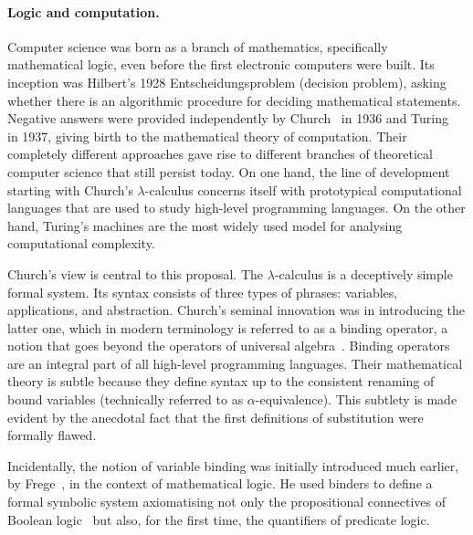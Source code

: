 \documentclass[11pt,twocolumn]{article}
\newcommand{\pref}[1]{\,(\ref{#1})}
\newcommand{\lcalculus}{\mbox{$\lambda$-calculus}}
\begin{document}
\paragraph{Logic and computation.}

Computer science was born as a branch of mathematics, specifically
mathematical logic, even before the first electronic computers were built.
Its inception %
was Hilbert's %
1928 Entscheidungsproblem (decision problem),
asking whether there is an algorithmic procedure for deciding mathematical
statements.  Negative answers were provided independently by
Church~\cite{Church1936} in 1936 and Turing~\cite{Turing} in 1937,
giving birth to the mathematical theory of computation.  Their completely
different approaches gave rise to different branches of theoretical
computer science that still persist today.  
On one hand, the line
of development starting with Church's {\lcalculus} %
concerns itself with prototypical computational languages that are
used to study high-level programming languages.  
On the other hand, Turing's machines %
are the most widely 
used model for analysing computational complexity.

Church's view is central to this proposal.  The {\lcalculus} is a
deceptively simple formal system.  Its syntax consists of three types of
phrases: variables, applications, and abstraction.  Church's seminal
innovation was in introducing the latter one, 
which in modern terminology is referred to as a binding operator, a notion
that goes beyond the operators of universal algebra~\cite{Birkhoff}.
Binding operators are an integral part of all high-level  programming
languages.  Their mathematical theory is subtle %
because they define syntax up to the consistent renaming of bound
variables (technically referred to as \mbox{$\alpha$-equivalence}).
This subtlety is made evident by the anecdotal fact that the first definitions of
substitution were formally flawed.  

Incidentally, the notion of variable binding was initially introduced much
earlier, by Frege~\cite{Frege1879}, in the context of mathematical logic.  
He used binders to define a formal symbolic
system axiomatising not only the propositional connectives of Boolean
logic~\cite{Boole} but also, for the first time, the quantifiers of
predicate logic.
\end{document}
